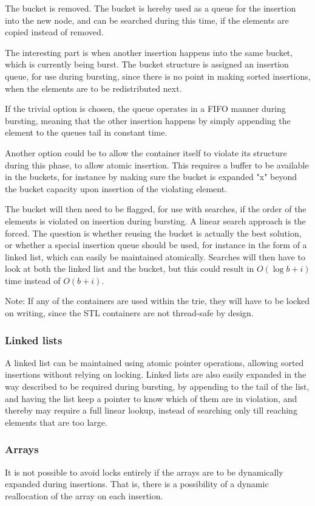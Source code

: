 The bucket is removed. The bucket is hereby used as a queue for the
insertion into the new node, and can be searched during this time, if the
elements are copied instead of removed.

The interesting part is when another insertion happens into the same bucket,
which is currently being burst. The bucket structure is assigned an insertion
queue, for use during bursting, since there is no point in making sorted
insertions, when the elements are to be redistributed next.

If the trivial option is chosen, the queue
operates in a FIFO manner during bursting, meaning that the other insertion
happens by simply appending the element to the queues tail in constant time.

Another option could be to allow the container itself to violate its structure
during this phase, to allow atomic insertion.
This requires a buffer to be available in the buckets, for instance by making
sure the bucket is expanded "x" beyond the bucket capacity upon insertion of
the violating element.

The bucket will then need to be flagged, for use with searches, if the order of
the elements is violated on insertion during bursting. A linear search approach
is the forced. The question is whether reusing the bucket is actually the best
solution, or whether a special insertion queue should be used, for instance in
the form of a linked list, which can easily be maintained atomically. Searches
will then have to look at both the linked list and the bucket, but this could
result in $O(\log b + i)$ time instead of $O(b+i)$.

{ Note:} If any  of the \STL containers are used within the trie, they will
have to be locked on writing, since the STL containers are not thread-safe by
design.

\subsubsection{Linked lists}
A linked list can be maintained using atomic pointer operations, allowing
sorted insertions without relying on locking.
Linked lists are also easily expanded in the way described to be required during
bursting, by appending to the tail of the list, and having the list keep a
pointer to know which of them are in violation, and thereby may require a
full linear lookup, instead of searching only till reaching elements that are
too large.

\subsubsection{Arrays}
It is not possible to avoid locks entirely if the arrays are to be dynamically
expanded during insertions. That is, there is a possibility of a dynamic
reallocation of the array on each insertion.

